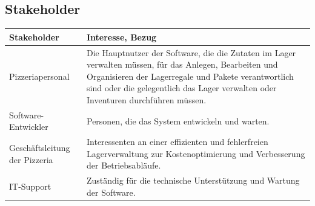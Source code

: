 \newpage
\subsection{Stakeholder}

\begin{longtable}{|m{}|m{}|}
    \hline
    \textbf{Stakeholder} & \textbf{Interesse, Bezug} \\
    \hline
    Pizzeriapersonal & Die Hauptnutzer der Software, die die Zutaten im Lager verwalten müssen, für das Anlegen, Bearbeiten und Organisieren der Lagerregale und Pakete verantwortlich sind oder die gelegentlich das Lager verwalten oder Inventuren durchführen müssen.\\
    \hline
    Software-Entwickler & Personen, die das System entwickeln und warten. \\
    \hline
    Geschäftsleitung der Pizzeria & Interessenten an einer effizienten und fehlerfreien Lagerverwaltung zur Kostenoptimierung und Verbesserung der Betriebsabläufe. \\
    \hline
    IT-Support & Zuständig für die technische Unterstützung und Wartung der Software. \\
    \hline
\end{longtable}